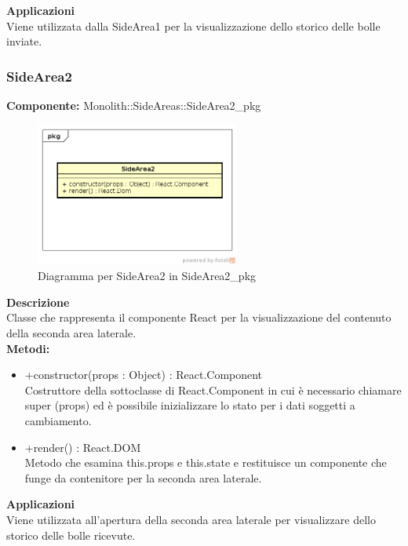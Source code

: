 \textbf{Applicazioni}\\
Viene utilizzata dalla SideArea1 per la visualizzazione dello storico delle bolle inviate. 


\clearpage

\subsubsection{SideArea2}
\textbf{Componente:}  Monolith::SideAreas::SideArea2\_pkg\\
   \FloatBarrier
   \begin{figure}[ht]
   \centering
   \includegraphics[width=0.6\textwidth]{img/single-SideArea2}
   \caption{{Diagramma per SideArea2 in SideArea2\_pkg}}
\end{figure}
\FloatBarrier
\textbf{Descrizione}\\
Classe che rappresenta il componente React per la visualizzazione del contenuto della seconda area laterale. \\
\textbf{Metodi:} 
\begin{itemize}

\item +constructor(props : Object) : React.Component 
\\
Costruttore della sottoclasse di React.Component in cui è necessario chiamare super (props) ed è possibile inizializzare lo stato per i dati soggetti a cambiamento.

\item +render() : React.DOM 
\\
Metodo che esamina this.props e this.state e restituisce un componente che funge da contenitore per la seconda area laterale.

\end{itemize} 


\textbf{Applicazioni}\\
Viene utilizzata all'apertura della seconda area laterale per visualizzare dello storico delle bolle ricevute. 


